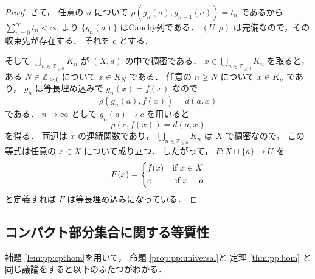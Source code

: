 \documentclass[leqno, 12pt]{jsarticle}
\newcommand{\zz}{\mathbb{Z}}
\newcommand{\yozz}[1]{\zz_{\ge #1}}
\begin{document}
\begin{proof}
さて，%
任意の
$n$
について
$\rho(g_{n}(a), g_{n+1}(a))=t_n$
であるから
$\sum_{n=0}^{\infty}t_n<\infty$
より
$\{g_{n}(a)\}$
はCauchy列である．
$(U,\rho)$
は完備なので，その収束先が存在する．
それを
$c$
とする．



そして
$\bigcup_{n\in \yozz{0}}K_{n}$
が
$(X, d)$
の中で稠密である．
$x\in\bigcup_{n\in\yozz{0}}K_n$
を取ると，
ある
$N\in\yozz{0}$
について
$x\in K_N$
である．
任意の
$n\geq N$
について
$x\in K_n$
であり，
$g_n$
は等長埋め込みで
$g_n(x)=f(x)$
なので
\[
\rho(g_n(a),f(x))=d(a,x)
\]
である．
$n\to\infty$
として
$g_n(a)\to c$
を用いると
\[
\rho(c,f(x))=d(a,x)
\]
を得る．
両辺は
$x$
の連続関数であり，
$\bigcup_{n\in\yozz{0}}K_n$
は
$X$
で稠密なので，
この等式は任意の
$x\in X$
について成り立つ．
したがって，
$F\colon  X\sqcup \{a\}\to U$%
を
\[
F(x)=
\begin{dcases}
	f(x) & \text{if
$x\in X$%
}\\
	c & \text{ if
$x=a$%
}
\end{dcases}
\]
と定義すれば
$F$
は等長埋め込みになっている．
\end{proof}


\subsection{コンパクト部分集合に関する等質性}\label{subsec:uniqueness:compact-homogeneity}
補題
\ref{lem:pp:cpthom}を用いて，
命題
\ref{prop:pp:universal}と
定理
\ref{thm:pp:hom}
と同じ議論をすると以下のふたつがわかる．
\end{document}
